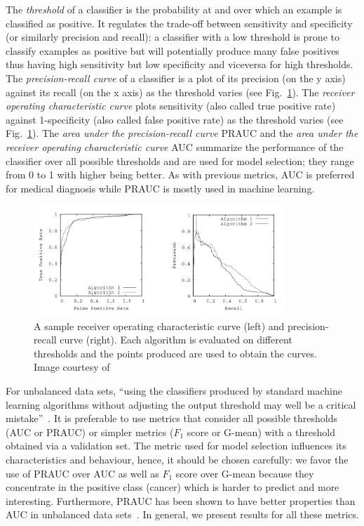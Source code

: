 The \emph{threshold} of a classifier is the probability at and over which an example is classified as positive. It regulates the trade-off between sensitivity and specificity (or similarly precision and recall): a classifier with a low threshold is prone to classify examples as positive but will potentially produce many false positives thus having high sensitivity but low specificity and viceversa for high thresholds. The \emph{precision-recall curve} of a classifier is a plot of its precision (on the y axis) against its recall (on the x axis) as the threshold varies (see Fig.~\ref{fig:AUCandPRAUC}). The \emph{receiver operating characteristic curve} plots sensitivity (also called true positive rate) against 1-specificity (also called false positive rate) as the threshold varies (see Fig.~\ref{fig:AUCandPRAUC}). The \emph{area under the precision-recall curve} PRAUC and the \emph{area under the receiver operating characteristic curve} AUC summarize the performance of the classifier over all possible thresholds and are used for model selection; they range from 0 to 1 with higher being better. As with previous metrics, AUC is preferred for medical diagnosis while PRAUC is mostly used in machine learning. 
\begin{figure}[h]
	\centering
	\includegraphics[width = 0.85\textwidth]{plots/AUCandPRAUC.png}
	\caption[Sample ROC and PR curves]{A sample receiver operating characteristic curve (left) and precision-recall curve (right). Each algorithm is evaluated on different thresholds and the points produced are used to obtain the curves. Image courtesy of~\cite{Davis2006}}
	\label{fig:AUCandPRAUC}
\end{figure}

For unbalanced data sets, ``using the classifiers produced by standard machine learning algorithms without adjusting the output threshold may well be a critical mistake''~\cite{Provost2000}. It is preferable to use metrics that consider all possible thresholds (AUC or PRAUC) or simpler metrics ($F_1$ score or G-mean) with a threshold obtained via a validation set. The metric used for model selection influences its characteristics and behaviour, hence, it should be chosen carefully: we favor the use of PRAUC over AUC as well as $F_1$ score over G-mean because they concentrate in the positive class (cancer) which is harder to predict and more interesting. Furthermore, PRAUC has been shown to have better properties than AUC in unbalanced data sets~\cite{Davis2006}. In general, we present results for all these metrics. 

